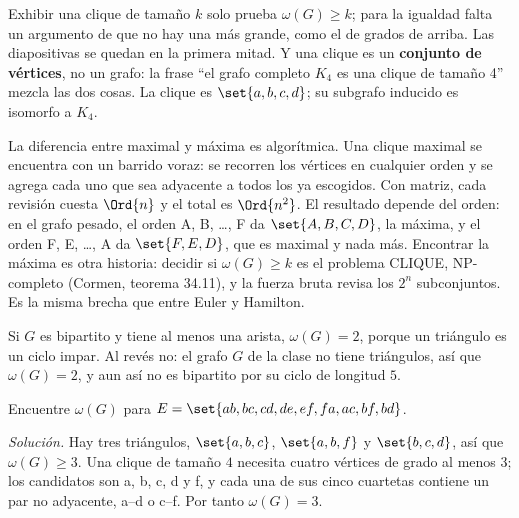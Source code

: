 \documentclass[11pt,letterpaper]{article}
\begin{document}
\begin{ojo}
  Exhibir una clique de tamaño $k$ solo prueba $\omega(G) \ge k$; para
  la igualdad falta un argumento de que no hay una más grande, como
  el de grados de arriba. Las diapositivas se quedan en la primera
  mitad. Y una clique es un \textbf{conjunto de vértices}, no un
  grafo: la frase ``el grafo completo $K_4$ es una clique de tamaño
  4'' mezcla las dos cosas. La clique es $\set{a, b, c, d}$; su
  subgrafo inducido es isomorfo a $K_4$.
\end{ojo}

La diferencia entre maximal y máxima es algorítmica. Una clique
maximal se encuentra con un barrido voraz: se recorren los vértices
en cualquier orden y se agrega cada uno que sea adyacente a todos los
ya escogidos. Con matriz, cada revisión cuesta $\Ord{n}$ y el total
es $\Ord{n^2}$. El resultado depende del orden: en el grafo pesado,
el orden A, B, \dots, F da $\set{A, B, C, D}$, la máxima, y el orden
F, E, \dots, A da $\set{F, E, D}$, que es maximal y nada más. Encontrar
la máxima es otra historia: decidir si $\omega(G) \ge k$ es el
problema CLIQUE, NP-completo (Cormen, teorema 34.11), y la fuerza
bruta revisa los $2^n$ subconjuntos. Es la misma brecha que entre
Euler y Hamilton.

\begin{observacion}
  Si $G$ es bipartito y tiene al menos una arista, $\omega(G) = 2$,
  porque un triángulo es un ciclo impar. Al revés no: el grafo $G$ de
  la clase no tiene triángulos, así que $\omega(G) = 2$, y aun así no
  es bipartito por su ciclo de longitud $5$.
\end{observacion}

\begin{ejercicio}
  \label{ej:clique-hexagono}
  Encuentre $\omega(G)$ para
  $E = \set{ab, bc, cd, de, ef, fa, ac, bf, bd}$.

  \begin{minipage}[c]{0.28\linewidth}
  \centering
  \end{minipage}\hfill
  \begin{minipage}[c]{0.68\linewidth}
  \textit{Solución.} Hay tres triángulos, $\set{a, b, c}$,
  $\set{a, b, f}$ y $\set{b, c, d}$, así que $\omega(G) \ge 3$. Una
  clique de tamaño $4$ necesita cuatro vértices de grado al menos
  $3$; los candidatos son a, b, c, d y f, y cada una de sus cinco
  cuartetas contiene un par no adyacente, a--d o c--f. Por tanto
  $\omega(G) = 3$.
  \end{minipage}
\end{ejercicio}
\end{document}
